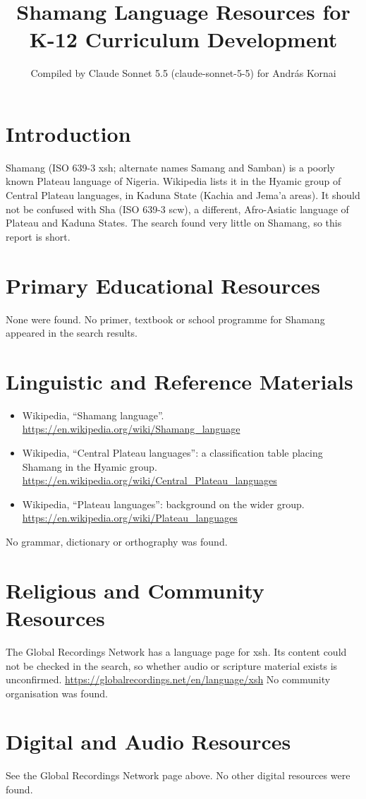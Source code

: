 \documentclass[12pt]{article}
\title{Shamang Language Resources for K-12 Curriculum Development}
\author{Compiled by Claude Sonnet 5.5 (claude-sonnet-5-5) for Andr\'as Kornai}
\date{}
\begin{document}
\maketitle

\section{Introduction}
Shamang (ISO 639-3 xsh; alternate names Samang and Samban) is a poorly known Plateau language of Nigeria. Wikipedia lists it in the Hyamic group of Central Plateau languages, in Kaduna State (Kachia and Jema'a areas). It should not be confused with Sha (ISO 639-3 scw), a different, Afro-Asiatic language of Plateau and Kaduna States. The search found very little on Shamang, so this report is short.

\section{Primary Educational Resources}
None were found. No primer, textbook or school programme for Shamang appeared in the search results.

\section{Linguistic and Reference Materials}
\begin{itemize}
\item Wikipedia, ``Shamang language''. \url{https://en.wikipedia.org/wiki/Shamang_language}
\item Wikipedia, ``Central Plateau languages'': a classification table placing Shamang in the Hyamic group. \url{https://en.wikipedia.org/wiki/Central_Plateau_languages}
\item Wikipedia, ``Plateau languages'': background on the wider group. \url{https://en.wikipedia.org/wiki/Plateau_languages}
\end{itemize}
No grammar, dictionary or orthography was found.

\section{Religious and Community Resources}
The Global Recordings Network has a language page for xsh. Its content could not be checked in the search, so whether audio or scripture material exists is unconfirmed. \url{https://globalrecordings.net/en/language/xsh}
No community organisation was found.

\section{Digital and Audio Resources}
See the Global Recordings Network page above. No other digital resources were found.
\end{document}
